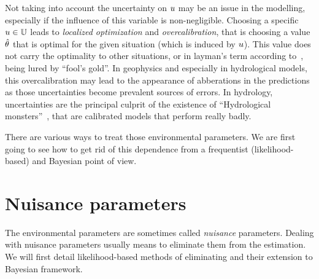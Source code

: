 \documentclass[../../Main_ManuscritThese.tex]{subfiles}
\begin{document}


Not taking into account the uncertainty on $u$ may be an issue in the modelling, especially if the influence of this variable is non-negligible.
Choosing a specific $u \in \mathbb{U}$ leads to \emph{localized optimization} \citep{huyse_free-form_2001} and \emph{overcalibration}, that is choosing a value $\hat{\theta}$ that is optimal for the given situation (which is induced by $u$). This value does not carry the optimality to other situations, or in layman's term according to~\cite{andreassian_all_2012}, being lured by ``fool's gold''.
In geophysics and especially in hydrological models, this overcalibration may lead to the appearance of abberations in the predictions as those uncertainties become prevalent sources of errors. In hydrology, uncertainties are the principal culprit of the existence of  ``Hydrological monsters''~\citep{kuczera_there_2010}, that are calibrated models that perform really badly.

There are various ways to treat those environmental parameters. We are first going to see how to get rid of this dependence from a frequentist (likelihood-based) and Bayesian point of view.


\section{Nuisance parameters}
\label{sec:nuisance_parameters}
The environmental parameters are sometimes called \emph{nuisance} parameters.
Dealing with nuisance parameters usually means to eliminate them from the estimation. We will first detail likelihood-based methods of eliminating and their extension to Bayesian framework. 
\end{document}
